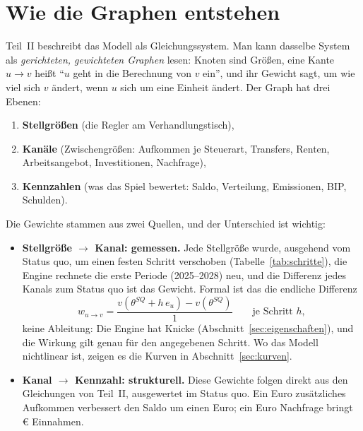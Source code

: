 %

\section{Wie die Graphen entstehen}
\label{sec:graphmethode}

Teil~II beschreibt das Modell als Gleichungssystem. Man kann dasselbe System als
\emph{gerichteten, gewichteten Graphen} lesen: Knoten sind Größen, eine Kante $u\to v$ heißt
\enquote{$u$ geht in die Berechnung von $v$ ein}, und ihr Gewicht sagt, um wie viel sich $v$
ändert, wenn $u$ sich um eine Einheit ändert. Der Graph hat drei Ebenen:

\begin{enumerate}
\item \textbf{Stellgrößen} (die Regler am Verhandlungstisch),
\item \textbf{Kanäle} (Zwischengrößen: Aufkommen je Steuerart, Transfers, Renten,
  Arbeitsangebot, Investitionen, Nachfrage),
\item \textbf{Kennzahlen} (was das Spiel bewertet: Saldo, Verteilung, Emissionen, BIP,
  Schulden).
\end{enumerate}

Die Gewichte stammen aus zwei Quellen, und der Unterschied ist wichtig:

\begin{itemize}
\item \textbf{Stellgröße $\to$ Kanal: gemessen.} Jede Stellgröße wurde, ausgehend vom Status
  quo, um einen festen Schritt verschoben (Tabelle~\ref{tab:schritte}), die Engine rechnete
  die erste Periode (2025--2028) neu, und die Differenz jedes Kanals zum Status quo ist das
  Gewicht. Formal ist das die endliche Differenz
  \begin{equation}
    w_{u\to v}=\frac{v(\theta^{SQ}+h\,e_u)-v(\theta^{SQ})}{1}\qquad\text{je Schritt }h,
  \end{equation}
  keine Ableitung: Die Engine hat Knicke (Abschnitt~\ref{sec:eigenschaften}), und die
  Wirkung gilt genau für den angegebenen Schritt. Wo das Modell nichtlinear ist, zeigen es
  die Kurven in Abschnitt~\ref{sec:kurven}.
\item \textbf{Kanal $\to$ Kennzahl: strukturell.} Diese Gewichte folgen direkt aus den
  Gleichungen von Teil~II, ausgewertet im Status quo. Ein Euro zusätzliches Aufkommen
  verbessert den Saldo um einen Euro; ein Euro Nachfrage bringt \Wstabil\,\euro{} Einnahmen.
\end{itemize}


